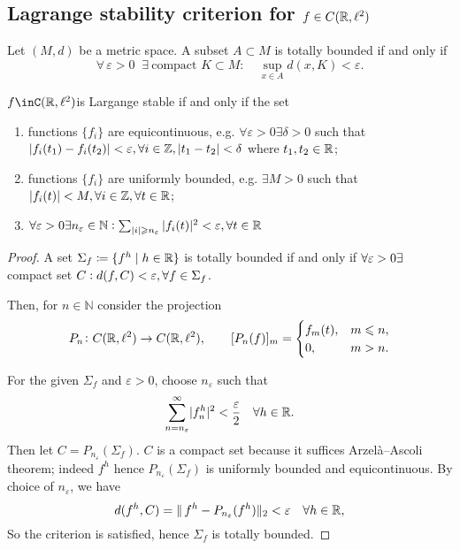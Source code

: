 \subsection{Lagrange stability criterion for \(f\in C(\mathbb{R},\ell^2)\)}
\begin{lemma}
Let $(M,d)$ be a metric space. A subset $A\subset M$ is totally bounded if and only if
\[
  \forall\,\varepsilon>0\;\;\exists\ \text{compact }K\subset M:\quad
  \sup_{x\in A}d(x,K)<\varepsilon.
\]
\end{lemma}
\begin{lemma}
    \(f\inC(\R,\ell^2)\)is Largange stable if and only if the set
    \begin{enumerate}
        \item functions \(\{f_i\}\) are equicontinuous, e.g. \(\forall \varepsilon > 0 \exists \delta > 0\) such that \(|f_i(t_1) - f_i(t_2)| < \varepsilon,  \forall i \in \mathbb{Z}, |t_1-t_2| < \delta\) where \(t_1,t_2 \in \mathbb{R}\);
        \item functions \(\{f_i\}\) are uniformly bounded, e.g. \(\exists M > 0\) such that \(|f_i(t)| < M, \forall i \in \mathbb{Z}, \forall t \in \mathbb{R}\);
        \item \(\forall \varepsilon > 0 \exists n_{\varepsilon} \in \mathbb{N} : \sum_{|i|\geqslant n_{\varepsilon}} |f_i(t)|^2 < \varepsilon, \forall t \in \mathbb{R}\)
    \end{enumerate}
\end{lemma}
\begin{proof}
    A set \(\Sigma_f\coloneqq\{f^h\mid h\in\mathbb{R}\}\) is totally bounded if and only if
    \(\forall\varepsilon>0 \exists\) compact set \(C : d(f, C)<\varepsilon, \forall f\in\Sigma_f\).
    
    Then, for \(n\in\mathbb{N}\) consider the projection
    \[
    P_n\colon C(\mathbb{R}, \ell^2) \to C(\mathbb{R}, \ell^2),\qquad
    [P_n(f)]_m =
    \begin{cases}
    f_m(t), & m \leqslant n,\\
    0,   & m > n.
    \end{cases}
    \]
    
    For the given \(\Sigma_f\) and \(\varepsilon>0\), choose \(n_\varepsilon\) such that
    \[
    \sum_{n=n_\varepsilon}^\infty \lvert f^h_n\rvert^2 < \frac{\varepsilon}{2}
    \quad \forall h\in \mathbb{R}.
    \]
    Then let \(C = P_{n_\varepsilon}(\Sigma_f)\).
    \(C\) is a compact set because it suffices Arzelà–Ascoli theorem;
    indeed \(f^h\) hence \(P_{n_\varepsilon}(\Sigma_f)\) is uniformly bounded and equicontinuous.
    By choice of \(n_\varepsilon\), we have
    \[
    d(f^h, C) = \|\,f^h - P_{n_\varepsilon}(f^h)\|_2 < \varepsilon
    \quad \forall h\in \mathbb{R},
    \]
    So the criterion is satisfied, hence \(\Sigma_f\) is totally bounded.
\end{proof}
